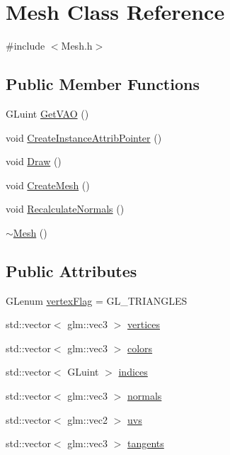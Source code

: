 \hypertarget{class_mesh}{}\section{Mesh Class Reference}
\label{class_mesh}


{\ttfamily \#include $<$Mesh.\+h$>$}

\subsection*{Public Member Functions}
\begin{DoxyCompactItemize}
\item 
G\+Luint \mbox{\hyperlink{class_mesh_ad4917bc56c71f31974af4be3eb90a390}{Get\+V\+AO}} ()
\item 
void \mbox{\hyperlink{class_mesh_a916735fb6745a444abc21011e11ed3e4}{Create\+Instance\+Attrib\+Pointer}} ()
\item 
void \mbox{\hyperlink{class_mesh_afdd95c079fd0442afef8a6c421c8bfc9}{Draw}} ()
\item 
void \mbox{\hyperlink{class_mesh_ab4d75bfd6e4603aa774eba1cfb83bffe}{Create\+Mesh}} ()
\item 
void \mbox{\hyperlink{class_mesh_a2688a608e0185faef28105fae57ad76d}{Recalculate\+Normals}} ()
\item 
\mbox{\hyperlink{class_mesh_a5efe4da1a4c0971cfb037bd70304c303}{$\sim$\+Mesh}} ()
\end{DoxyCompactItemize}
\subsection*{Public Attributes}
\begin{DoxyCompactItemize}
\item 
G\+Lenum \mbox{\hyperlink{class_mesh_aa4fa174a34713f4f3286bd202d5d3617}{vertex\+Flag}} = G\+L\+\_\+\+T\+R\+I\+A\+N\+G\+L\+ES
\item 
std\+::vector$<$ glm\+::vec3 $>$ \mbox{\hyperlink{class_mesh_aee572fab7113a18cf174a8418394aef4}{vertices}}
\item 
std\+::vector$<$ glm\+::vec3 $>$ \mbox{\hyperlink{class_mesh_a484b6f05575dbac43b3f5de817f90069}{colors}}
\item 
std\+::vector$<$ G\+Luint $>$ \mbox{\hyperlink{class_mesh_a5e55b84c6c967608bcf23ed7d68e4215}{indices}}
\item 
std\+::vector$<$ glm\+::vec3 $>$ \mbox{\hyperlink{class_mesh_a51622ff35f286e2015954aad76ee4bc2}{normals}}
\item 
std\+::vector$<$ glm\+::vec2 $>$ \mbox{\hyperlink{class_mesh_af98b594a339f9e92ed0a4e1e4d84a6d9}{uvs}}
\item 
std\+::vector$<$ glm\+::vec3 $>$ \mbox{\hyperlink{class_mesh_aabfc88c0c59371aca2d8fe6227a1c3f1}{tangents}}
\end{DoxyCompactItemize}


